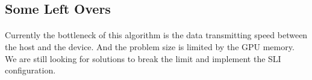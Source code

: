 \documentclass[11pt,reqno]{article}
\begin{document}
\subsection*{Some Left Overs}
\paragraph{} Currently the bottleneck of this algorithm is the data transmitting speed between the host and the device. And the problem size is limited by the GPU memory. We are still looking for solutions to break the limit and implement the SLI configuration.


 
\end{document}
